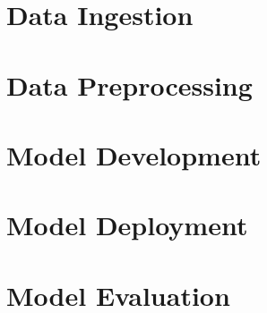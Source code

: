 \documentclass[12pt]{report}
\begin{document}

\section{Data Ingestion}

\section{Data Preprocessing}

\section{Model Development}

\section{Model Deployment}

\section{Model Evaluation}


\printbibliography
\end{document}

